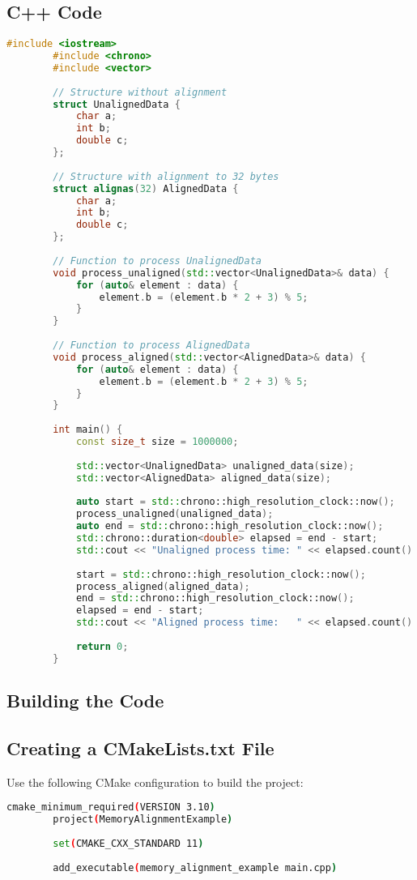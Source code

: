 \documentclass{article}
\begin{document}
	\subsection{C++ Code}
	\begin{lstlisting}[language=C++, caption=Memory Alignment Example]
		#include <iostream>
		#include <chrono>
		#include <vector>
		
		// Structure without alignment
		struct UnalignedData {
			char a;
			int b;
			double c;
		};
		
		// Structure with alignment to 32 bytes
		struct alignas(32) AlignedData {
			char a;
			int b;
			double c;
		};
		
		// Function to process UnalignedData
		void process_unaligned(std::vector<UnalignedData>& data) {
			for (auto& element : data) {
				element.b = (element.b * 2 + 3) % 5;
			}
		}
		
		// Function to process AlignedData
		void process_aligned(std::vector<AlignedData>& data) {
			for (auto& element : data) {
				element.b = (element.b * 2 + 3) % 5;
			}
		}
		
		int main() {
			const size_t size = 1000000;
			
			std::vector<UnalignedData> unaligned_data(size);
			std::vector<AlignedData> aligned_data(size);
			
			auto start = std::chrono::high_resolution_clock::now();
			process_unaligned(unaligned_data);
			auto end = std::chrono::high_resolution_clock::now();
			std::chrono::duration<double> elapsed = end - start;
			std::cout << "Unaligned process time: " << elapsed.count() << " s\n";
			
			start = std::chrono::high_resolution_clock::now();
			process_aligned(aligned_data);
			end = std::chrono::high_resolution_clock::now();
			elapsed = end - start;
			std::cout << "Aligned process time:   " << elapsed.count() << " s\n";
			
			return 0;
		}
	\end{lstlisting}
	
	\subsection{Building the Code}
	\subsection{Creating a CMakeLists.txt File}
	Use the following CMake configuration to build the project:
	\begin{lstlisting}[language=bash, caption=CMake Configuration]
		cmake_minimum_required(VERSION 3.10)
		project(MemoryAlignmentExample)
		
		set(CMAKE_CXX_STANDARD 11)
		
		add_executable(memory_alignment_example main.cpp)
	\end{lstlisting}
	
\end{document}
